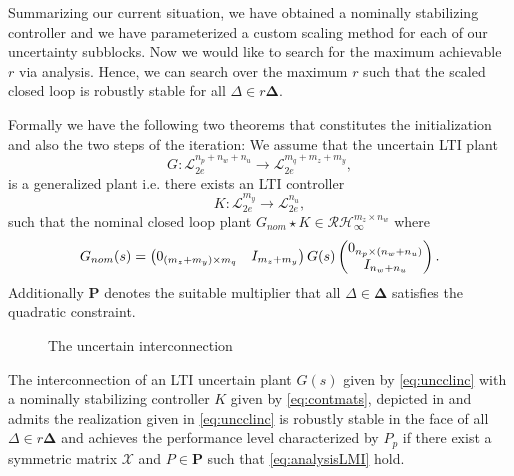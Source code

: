Summarizing our current situation, we have obtained a nominally stabilizing controller and we have parameterized a custom scaling method for each of our 
uncertainty subblocks. Now we would like to search for the maximum achievable $r$ via analysis. Hence, we can search over the maximum $r$ such that the 
scaled closed loop is robustly stable for all $\Delta\in r\bm{\Delta}$. 



Formally we have the following two theorems that constitutes the initialization and also the two steps of the iteration: We assume that 
the uncertain LTI plant 
\[
G:\mathcal{L}_{2e}^{n_p+n_w+n_u}\to\mathcal{L}_{2e}^{m_q+m_z+m_y},
\] 
is a generalized plant i.e. there exists an LTI controller 
\[
K:\mathcal{L}_{2e}^{m_y}\to\mathcal{L}_{2e}^{n_u},
\]
such that the nominal closed loop plant $G_{nom}\star K\in\mathcal{RH}_\infty^{m_z\times n_w}$ where 
\[
G_{nom}(s) = \begin{pmatrix}0_{(m_z+m_y)\times m_q} &I_{m_z+m_y}\end{pmatrix}G(s)\begin{pmatrix}0_{n_p\times(n_w+n_u)}\\I_{n_w+n_u}\end{pmatrix}. 
\]
Additionally $\mathbf{P}$ denotes the suitable multiplier that all $\Delta\in\bm{\Delta}$ satisfies the 
quadratic constraint.

\begin{figure}%
\centering
{}
\caption{The uncertain interconnection}%
\label{fig:uncicsynth}%
\end{figure}

\begin{thm} The interconnection of an LTI uncertain plant $G(s)$ given by \eqref{eq:uncclinc}
with a nominally stabilizing controller $K$ given by \eqref{eq:contmats}, depicted in  
and admits the realization given in \eqref{eq:uncclinc} is robustly stable in the face of all 
$\Delta\in r\bm{\Delta}$ and achieves the performance level characterized by $P_p$ if there exist a symmetric matrix 
$\mathcal{X}$ and $P\in\mathbf{P}$ such that \eqref{eq:analysisLMI} hold.
\end{thm}

